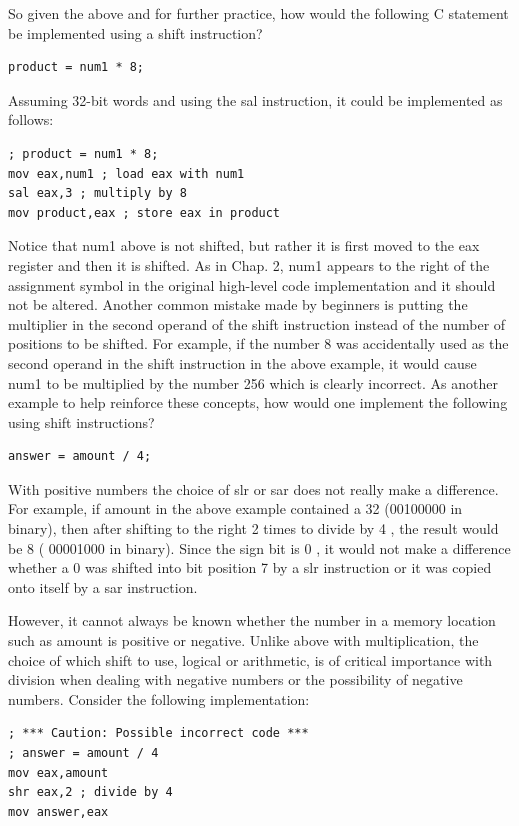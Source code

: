 \documentclass[10pt]{book}
\begin{document}
So given the above and for further practice, how would the following C statement be implemented using a shift instruction?

\begin{verbatim}
product = num1 * 8;
\end{verbatim}

Assuming 32-bit words and using the sal instruction, it could be implemented as follows:

\begin{verbatim}
; product = num1 * 8;
mov eax,num1 ; load eax with num1
sal eax,3 ; multiply by 8
mov product,eax ; store eax in product
\end{verbatim}

Notice that num1 above is not shifted, but rather it is first moved to the eax register and then it is shifted. As in Chap. 2, num1 appears to the right of the assignment symbol in the original high-level code implementation and it should not be altered. Another common mistake made by beginners is putting the multiplier in the second operand of the shift instruction instead of the number of positions to be shifted. For example, if the number 8 was accidentally used as the second operand in the shift instruction in the above example, it would cause num1 to be multiplied by the number 256 which is clearly incorrect. As another example to help reinforce these concepts, how would one implement the following using shift instructions?

\begin{verbatim}
answer = amount / 4;
\end{verbatim}

With positive numbers the choice of slr or sar does not really make a difference. For example, if amount in the above example contained a 32 (00100000 in binary), then after shifting to the right 2 times to divide by 4 , the result would be 8 ( 00001000 in binary). Since the sign bit is 0 , it would not make a difference whether a 0 was shifted into bit position 7 by a slr instruction or it was copied onto itself by a sar instruction.

However, it cannot always be known whether the number in a memory location such as amount is positive or negative. Unlike above with multiplication, the choice of which shift to use, logical or arithmetic, is of critical importance with division when dealing with negative numbers or the possibility of negative numbers. Consider the following implementation:

\begin{verbatim}
; *** Caution: Possible incorrect code ***
; answer = amount / 4
mov eax,amount
shr eax,2 ; divide by 4
mov answer,eax
\end{verbatim}
\end{document}
